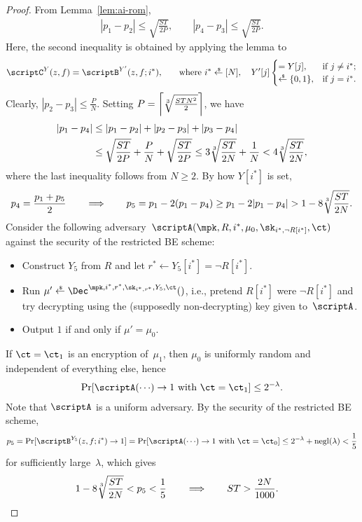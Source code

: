 \begin{proof}
From Lemma~\ref{lem:ai-rom},
\begin{align*}
|p_1-p_2|\leq\sqrt{\frac{ST}{2P}},\qquad
|p_4-p_3|\leq\sqrt{\frac{ST}{2P}}.
\end{align*}
Here, the second inequality is obtained by applying the lemma to
\begin{align*}
\scriptC^Y(z,f)=\scriptB^{Y'}(z,f;i^\ast)\textup{,\qquad where }
i^\ast\draws[N],\quad
Y'[j]\begin{cases}
=Y[j],&\textup{if }j\neq i^\ast;\\
\draws\bit,&\textup{if }j=i^\ast.
\end{cases}
\end{align*}
Clearly, ${|p_2-p_3|\leq\frac{P}{N}}$.
Setting ${P=\left\lceil\sqrt[3]{\frac{STN^2}{2}}\right\rceil}$, we have
\begin{align*}
|p_1-p_4|
&{}\leq
|p_1-p_2|+|p_2-p_3|+|p_3-p_4|
\\&{}\leq
\sqrt{\frac{ST}{2P}}+\frac{P}{N}+\sqrt{\frac{ST}{2P}}
\leq
3\sqrt[3]{\frac{ST}{2N}}+\frac1N
<
4\sqrt[3]{\frac{ST}{2N}},
\end{align*}
where the last inequality follows from ${N\geq 2}$.
By how $Y[i^\ast]$ is set,
\begin{align*}
p_4=\frac{p_1+p_5}{2}
\qquad
\Longrightarrow
\qquad
p_5
=p_1-2(p_1-p_4)
\geq p_1-2|p_1-p_4|
>1-8\sqrt[3]{\frac{ST}{2N}}.
\end{align*}
Consider the following adversary~$\scriptA(\mpk,R,i^\ast,\mu_0,\sk_{i^\ast,\neg R[i^\ast]},\ct)$ against the security of the restricted BE scheme:
\begin{itemize}
\item Construct $Y_5$ from $R$ and
let ${r^\ast\gets Y_5[i^\ast]=\neg R[i^\ast]}$.
\item Run ${\mu'\draws\Dec^{\mpk,i^\ast,r^\ast,\sk_{i^\ast,r^\ast},Y_5,\ct}()}$,
i.e., pretend $R[i^\ast]$ were $\neg R[i^\ast]$ and try decrypting using the (supposedly non-decrypting) key given to~$\scriptA$.
\item Output $1$ if and only if ${\mu'=\mu_0}$.
\end{itemize}
If ${\ct=\ct_1}$ is an encryption of~$\mu_1$, then $\mu_0$ is uniformly random and independent of everything else, hence
\begin{align*}
\Pr[\scriptA({\cdots})\to 1\textup{ with }\ct=\ct_1]\leq 2^{-\lambda}.
\end{align*}
Note that $\scriptA$ is a uniform adversary.
By the security of the restricted BE scheme,
\begin{align*}
p_5
=\Pr[\scriptB^{Y_5}(z,f;i^\ast)\to 1]
=\Pr[\scriptA({\cdots})\to 1\textup{ with }\ct=\ct_0]
\leq 2^{-\lambda}+\negl(\lambda)
<\frac15
\end{align*}
for sufficiently large~$\lambda$, which gives
\begin{align*}
1-8\sqrt[3]{\frac{ST}{2N}}<p_5<\frac15
&
\qquad\Longrightarrow\qquad
ST>\frac{2N}{1000}.
\qedhere
\end{align*}
\end{proof}
